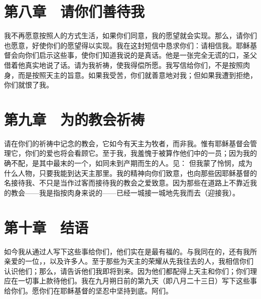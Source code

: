 
\section{第八章　请你们善待我}

我不再愿意按照人的方式生活，如果你们同意，我的愿望就会实现。那么，请你们也愿意，好使你们的愿望得以实现。我在这封短信中恳求你们：请相信我。耶稣基督会向你们启示这些事，使你们知道我说的是真话。他是一张完全无谎的口，圣父借着他真实地说了话。请为我祈祷，使我得偿所愿。我写信给你们，不是按照肉身，而是按照天主的旨意。如果我受苦，你们就善意地对我；但如果我遭到拒绝，你们就恨了我。\newline{}\par


\section{第九章　为的教会祈祷}

请在你们的祈祷中记念的教会，它如今有天主为牧者，而非我。惟有耶稣基督会管理它，你们的爱也将会看顾它。至于我，我羞愧于被算作他们中的一员；因为我的确不配，是其中最末的一个，如同未到产期而生的人。见： 但我蒙了怜悯，成为什么人物，只要我能到达天主那里。我的精神向你们致意，也向那些因耶稣基督的名接待我、不只是当作过客而接待我的教会之爱致意。因为那些在道路上不靠近我的教会——我是指按肉身来说的——已经一城接一城地先我而去（迎接我）。\newline{}\par


\section{第十章　结语}

如今我从通过人写下这些事给你们，他们实在是最有福的。与我同在的，还有我所亲爱的一位，，以及许多人。至于那些为天主的荣耀从先我往去的人，我相信你们认识他们；那么，请告诉他们我即将到来。因为他们都配得上天主和你们；你们理应在一切事上款待他们。我在九月朔日前的第九天（即八月二十三日）写下这些事给你们。愿你们在耶稣基督的坚忍中坚持到底。阿们。\newline{}\par

